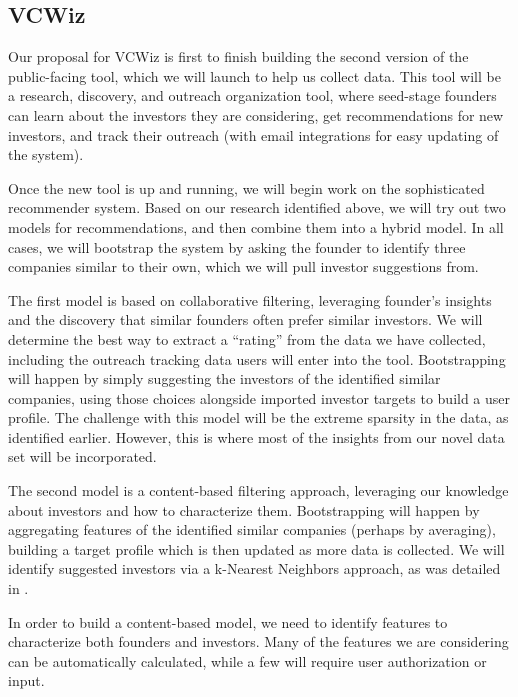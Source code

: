 
\subsection{VCWiz}

Our proposal for VCWiz is first to finish building the second version of the public-facing tool, which we will launch to help us collect data. This tool will be a research, discovery, and outreach organization tool, where seed-stage founders can learn about the investors they are considering, get recommendations for new investors, and track their outreach (with email integrations for easy updating of the system).

Once the new tool is up and running, we will begin work on the sophisticated recommender system. Based on our research identified above, we will try out two models for recommendations, and then combine them into a hybrid model. In all cases, we will bootstrap the system by asking the founder to identify three companies similar to their own, which we will pull investor suggestions from.

The first model is based on collaborative filtering, leveraging founder's insights and the discovery that similar founders often prefer similar investors. We will determine the best way to extract a ``rating'' from the data we have collected, including the outreach tracking data users will enter into the tool. Bootstrapping will happen by simply suggesting the investors of the identified similar companies, using those choices alongside imported investor targets to build a user profile. The challenge with this model will be the extreme sparsity in the data, as identified earlier. However, this is where most of the insights from our novel data set will be incorporated.

The second model is a content-based filtering approach, leveraging our knowledge about investors and how to characterize them. Bootstrapping will happen by aggregating features of the identified similar companies (perhaps by averaging), building a target profile which is then updated as more data is collected. We will identify suggested investors via a k-Nearest Neighbors approach, as was detailed in \cite{stone2014computational}.

In order to build a content-based model, we need to identify features to characterize both founders and investors. Many of the features we are considering can be automatically calculated, while a few will require user authorization or input.

